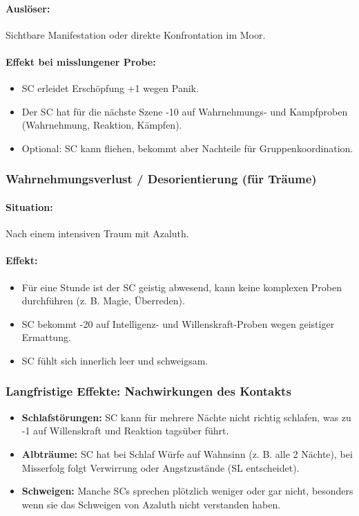 \paragraph{Auslöser:}
Sichtbare Manifestation oder direkte Konfrontation im Moor.
\paragraph{Effekt bei misslungener Probe:}
\begin{itemize}
\item SC erleidet Erschöpfung +1 wegen Panik.
\item Der SC hat für die nächste Szene -10 auf Wahrnehmungs- und Kampfproben (Wahrnehmung, Reaktion, Kämpfen).
\item Optional: SC kann fliehen, bekommt aber Nachteile für Gruppenkoordination.
\end{itemize}

\subsubsection*{Wahrnehmungsverlust / Desorientierung (für Träume)}
\paragraph{Situation:} Nach einem intensiven Traum mit Azaluth.
\paragraph{Effekt:}
\begin{itemize}
\item Für eine Stunde ist der SC geistig abwesend, kann keine komplexen Proben durchführen (z. B. Magie, Überreden).
\item SC bekommt -20 auf Intelligenz- und Willenskraft-Proben wegen geistiger Ermattung.
\item SC fühlt sich innerlich leer und schweigsam.
\end{itemize}

\subsubsection*{Langfristige Effekte: Nachwirkungen des Kontakts}
\begin{itemize}
\item \textbf{Schlafstörungen:} SC kann für mehrere Nächte nicht richtig schlafen, was zu -1 auf Willenskraft und Reaktion tagsüber führt.
\item \textbf{Albträume: }SC hat bei Schlaf Würfe auf Wahnsinn (z. B. alle 2 Nächte), bei Misserfolg folgt Verwirrung oder Angstzustände (SL entscheidet).
\item \textbf{Schweigen: }Manche SCs sprechen plötzlich weniger oder gar nicht, besonders wenn sie das Schweigen von Azaluth nicht verstanden haben.
\end{itemize}


